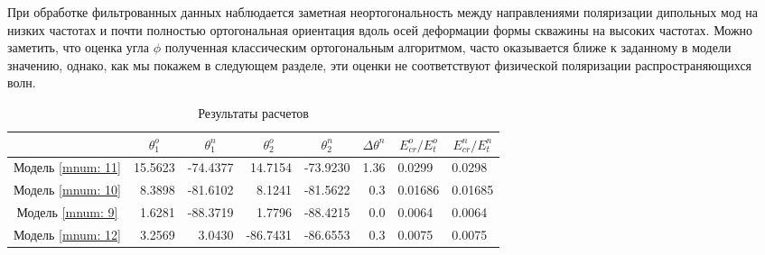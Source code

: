 \documentclass[a4paper,11pt]{article}
\begin{document}
При обработке фильтрованных данных наблюдается заметная неортогональность между направлениями поляризации дипольных мод на низких частотах и почти полностью ортогональная ориентация вдоль осей деформации формы скважины на высоких частотах. Можно заметить, что оценка угла $\phi$ полученная классическим ортогональным алгоритмом, часто оказывается ближе к заданному в модели значению, однако, как мы покажем в следующем разделе, эти оценки не соответствуют физической поляризации распространяющихся волн.

\begin{table}[h]
\footnotesize
\centering
\caption{Результаты расчетов}
\renewcommand{\arraystretch}{1.5}
\begin{tabularx}{\textwidth}{|C|rr|rr|r|ll|}
\hline	
				& &  &  &  & &  &  \\ \hline
\hline Модель \ref{mnum: 11} & 15.5623 & -74.4377 & 14.7154  & -73.9230  & 1.36  & 0.0299 & 0.0298 \\
 	   Модель \ref{mnum: 10} & 8.3898 & -81.6102 & 8.1241 & -81.5622 & 0.3 & 0.01686 & 0.01685 \\
 	   Модель \ref{mnum: 9} & 1.6281 & -88.3719 & 1.7796  & -88.4215  & 0.0  & 0.0064 & 0.0064 \\	   
	   Модель \ref{mnum: 12} & 3.2569 & 3.0430 & -86.7431  & -86.6553  & 0.3 & 0.0075 & 0.0075 \\ 	   
 	   \hline
\end{tabularx} 
\label{tab:std_process_results}
\renewcommand{\arraystretch}{1.0}
\end{table}
\end{document}
